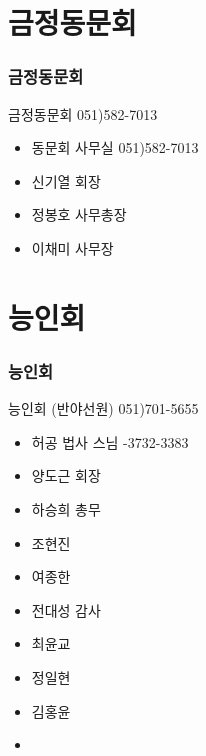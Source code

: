 \documentclass[aspectratio=1610,20pt,xcolor=pdftex,dvipsnames,table,handout]{beamer}
\begin{document}
		\section{금정동문회}
		\begin{frame} [t,plain]
		\frametitle{금정동문회}
			\begin{block} {금정동문회 051)582-7013}
			\setlength{\leftmargini}{1em}			
			\begin{itemize}
				\item 동문회 사무실 051)582-7013
				\item 신기열 회장	\hrulefill
				\item 정봉호 사무총장 	\hrulefill
				\item 이채미 사무장 	\hrulefill

			\end{itemize}
			\end{block}						
		\end{frame}					


		\section{능인회}
		\begin{frame} [t,plain]
		\frametitle{능인회}
			\begin{block} {능인회 (반야선원) 051)701-5655 }
			\setlength{\leftmargini}{1em}			
			\begin{itemize}
				\item 허공 법사 스님 	-3732-3383
				\item 양도근 회장	\hrulefill
				\item 하승희 총무	\hrulefill
				\item 조현진 	\hrulefill
				\item 여종한	\hrulefill
				\item 전대성 감사	\hrulefill
				\item 최윤교 	\hrulefill
				\item 정일현	\hrulefill
				\item 김홍윤	\hrulefill
				\item 

			\end{itemize}
			\end{block}						
		\end{frame}					
\end{document}
